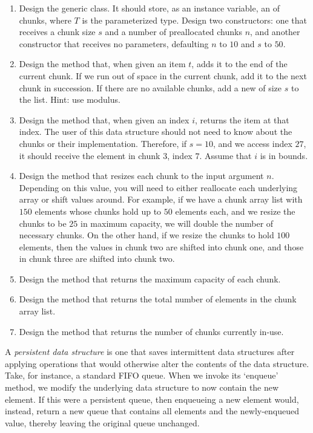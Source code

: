 \begin{enumerate}[label=(\alph*)]
    \item Design the generic  class. It should store, as an instance variable, an  of chunks, where $T$ is the parameterized type. Design two constructors: one that receives a chunk size $s$ and a number of preallocated chunks $n$, and another constructor that receives no parameters, defaulting $n$ to $10$ and $s$ to $50$.
    \item Design the  method that, when given an item $t$, adds it to the end of the current chunk. If we run out of space in the current chunk, add it to the next chunk in succession. If there are no available chunks, add a new  of size $s$ to the list. Hint: use modulus.
    \item Design the  method that, when given an index $i$, returns the item at that index. The user of this data structure should not need to know about the chunks or their implementation. Therefore, if $s=10$, and we access index $27$, it should receive the element in chunk $3$, index $7$. Assume that $i$ is in bounds.
    \item Design the  method that resizes each chunk to the input argument $n$. Depending on this value, you will need to either reallocate each underlying array or shift values around. For example, if we have a chunk array list with $150$ elements whose chunks hold up to $50$ elements each, and we resize the chunks to be $25$ in maximum capacity, we will double the number of necessary chunks. On the other hand, if we resize the chunks to hold $100$ elements, then the values in chunk two are shifted into chunk one, and those in chunk three are shifted into chunk two.
    \item Design the  method that returns the maximum capacity of each chunk.
    \item Design the  method that returns the total number of elements in the chunk array list.
    \item Design the  method that returns the number of chunks currently in-use.
\end{enumerate}

A \textit{persistent data structure} is one that saves intermittent data structures after applying operations that would otherwise alter the contents of the data structure. Take, for instance, a standard FIFO queue. When we invoke its `enqueue' method, we modify the underlying data structure to now contain the new element. If this were a persistent queue, then enqueueing a new element would, instead, return a new queue that contains all elements and the newly-enqueued value, thereby leaving the original queue unchanged.

